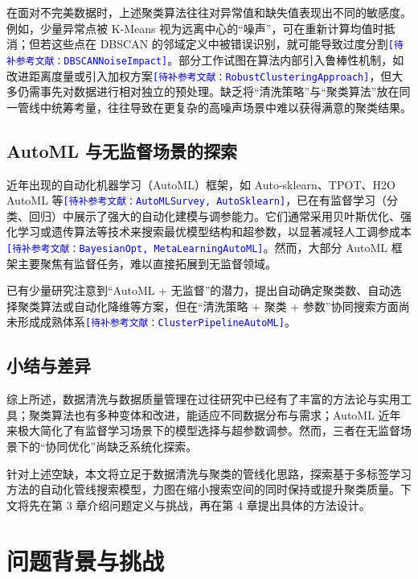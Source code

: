 \documentclass[10pt]{article} %
\numberwithin{equation}{section}
\begin{document}
在面对不完美数据时，上述聚类算法往往对异常值和缺失值表现出不同的敏感度\cite{Atif2024, Sloutsky2012}。例如，少量异常点被 K-Means 视为远离中心的“噪声”，可在重新计算均值时抵消；但若这些点在 DBSCAN 的邻域定义中被错误识别，就可能导致过度分割\textcolor{blue}{\texttt{[待补参考文献：DBSCANNoiseImpact]}}。部分工作试图在算法内部引入鲁棒性机制，如改进距离度量或引入加权方案\textcolor{blue}{\texttt{[待补参考文献：RobustClusteringApproach]}}，但大多仍需事先对数据进行相对独立的预处理。缺乏将“清洗策略”与“聚类算法”放在同一管线中统筹考量，往往导致在更复杂的高噪声场景中难以获得满意的聚类结果。

\subsection{AutoML 与无监督场景的探索}
近年出现的自动化机器学习（AutoML）框架，如 Auto-sklearn、TPOT、H2O AutoML 等\textcolor{blue}{\texttt{[待补参考文献：AutoMLSurvey, AutoSklearn]}}，已在有监督学习（分类、回归）中展示了强大的自动化建模与调参能力。它们通常采用贝叶斯优化、强化学习或遗传算法等技术来搜索最优模型结构和超参数，以显著减轻人工调参成本\textcolor{blue}{\texttt{[待补参考文献：BayesianOpt, MetaLearningAutoML]}}。然而，大部分 AutoML 框架主要聚焦有监督任务，难以直接拓展到无监督领域。

已有少量研究注意到“AutoML + 无监督”的潜力，提出自动确定聚类数、自动选择聚类算法或自动化降维等方案\cite{Bahmani2021ToTune, 9458702}，但在“清洗策略 + 聚类 + 参数”协同搜索方面尚未形成成熟体系\textcolor{blue}{\texttt{[待补参考文献：ClusterPipelineAutoML]}}。

\subsection{小结与差异}
综上所述，数据清洗与数据质量管理在过往研究中已经有了丰富的方法论与实用工具；聚类算法也有多种变体和改进，能适应不同数据分布与需求；AutoML 近年来极大简化了有监督学习场景下的模型选择与超参数调参。然而，三者在无监督场景下的“协同优化”尚缺乏系统化探索。

针对上述空缺，本文将立足于数据清洗与聚类的管线化思路，探索基于多标签学习方法的自动化管线搜索模型，力图在缩小搜索空间的同时保持或提升聚类质量。下文将先在第 3 章介绍问题定义与挑战，再在第 4 章提出具体的方法设计。


\section{问题背景与挑战}\label{sec:problem-and-model}
\end{document}
